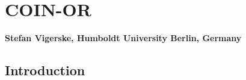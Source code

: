 \renewenvironment{option_tabular}%
{\begin{tabular}{p{.16\textwidth}p{.65\textwidth}p{.11\textwidth}}
\hline
\textbf{Option}      &
\textbf{Description} &
\textbf{Default}     \\
\hline}
{\end{tabular}}

\renewenvironment{tab_list}[1]%
{\begin{list}{}{\vspace*{-1.5ex}\renewcommand{\makelabel}{\desclabel}\parsep-0.15cm\labelwidth#1\leftmargin#1\setlength{\labelsep}{\itemindent}\topsep0cm\parskip0cm\partopsep0cm}}%
{\end{list}}

\newcommand{\MYGAMS}{\textsc{GAMS}\xspace}
\newcommand{\BONMIN}{\textsc{Bonmin}\xspace}
\newcommand{\CBC}{\textsc{CBC}\xspace}
\newcommand{\COUENNE}{\textsc{Couenne}\xspace}
\newcommand{\IPOPT}{\textsc{Ipopt}\xspace}
\newcommand{\OS}{\textsc{OS}\xspace}
\newcommand{\OSI}{\textsc{OSI}\xspace}
\newcommand{\OSICPLEX}{\textsc{OsiCplex}\xspace}
\newcommand{\OSIGUROBI}{\textsc{OsiGurobi}\xspace}
\newcommand{\OSIGLPK}{\textsc{OsiGlpk}\xspace}
\newcommand{\OSIMOSEK}{\textsc{OsiMosek}\xspace}
\newcommand{\OSIXPRESS}{\textsc{OsiXpress}\xspace}
\newcommand{\CPLEX}{\textsc{CPLEX}\xspace}
\newcommand{\GUROBI}{\textsc{GUROBI}\xspace}
\newcommand{\GLPK}{\textsc{GLPK}\xspace}
\newcommand{\MOSEK}{\textsc{MOSEK}\xspace}
\newcommand{\XPRESS}{\textsc{XPRESS}\xspace}

\newcommand{\printoption}[5]%
{\textbf{\ttfamily #1}\; ({\ttfamily #2}) \hfill \texttt{#3}\\
#4
#5
}
\newcommand{\printoptioncategory}[1]{\smallskip

\textbf{#1}

}

\chapter{COIN-OR}
\textbf{Stefan Vigerske, Humboldt University Berlin, Germany}
\vspace{1cm}

\minitoc

\section{Introduction}

